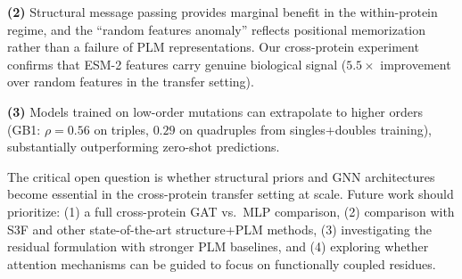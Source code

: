 \documentclass{article}
\begin{document}
\textbf{(2)} Structural message passing provides marginal benefit in the within-protein regime, and the ``random features anomaly'' reflects positional memorization rather than a failure of PLM representations. Our cross-protein experiment confirms that ESM-2 features carry genuine biological signal ($5.5\times$ improvement over random features in the transfer setting).

\textbf{(3)} Models trained on low-order mutations can extrapolate to higher orders (GB1: $\rho = 0.56$ on triples, $0.29$ on quadruples from singles+doubles training), substantially outperforming zero-shot predictions.

The critical open question is whether structural priors and GNN architectures become essential in the cross-protein transfer setting at scale. Future work should prioritize: (1) a full cross-protein GAT vs.\ MLP comparison, (2) comparison with S3F and other state-of-the-art structure+PLM methods, (3) investigating the residual formulation with stronger PLM baselines, and (4) exploring whether attention mechanisms can be guided to focus on functionally coupled residues.


\end{document}
